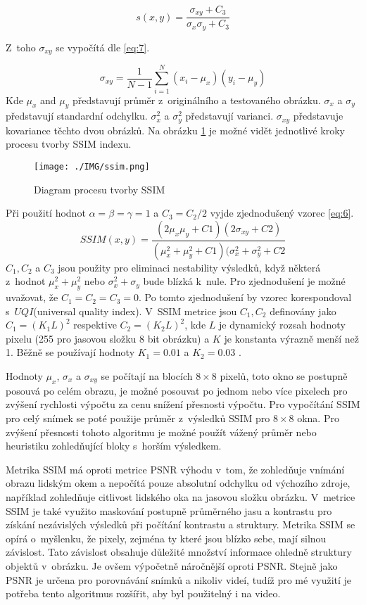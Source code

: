 \documentclass[thesis=M,czech]{FITthesis}[2016/06/26]
\begin{document}
\begin{equation}\label{eq:5}
s(x, y) = \frac{\sigma_{xy} + C_3}{\sigma_x\sigma_y+C_3}
\end{equation}

Z~toho $\sigma_{xy}$ se vypočítá dle \ref{eq:7}.

\begin{equation}\label{eq:7}
\sigma_{xy} = \frac{1}{N-1} \sum_{i=1}^{N} (x_i-\mu_x)(y_i-\mu_y)
\end{equation}
Kde  $\mu_x$ and $\mu_y$ představují průměr z~originálního a testovaného obrázku. $\sigma_x$ a $\sigma_y$ představují standardní odchylku. $\sigma_x^2$ a $\sigma_y^2$ představují varianci. $\sigma_{xy}$ představuje kovariance těchto dvou obrázků.
Na obrázku \ref{fig:ssim} je možné vidět jednotlivé kroky procesu tvorby SSIM indexu.
\begin{figure}[h]\centering
\texttt{[image: ./IMG/ssim.png]}
\caption{Diagram procesu tvorby SSIM}
\label{fig:ssim}
\end{figure}


Při použití hodnot $\alpha = \beta = \gamma = 1$ a $C_3=C_2/2$ \cite{SSIM1} vyjde zjednodušený vzorec \ref{eq:6}.
\begin{equation}\label{eq:6}
\mathit{SSIM}(x, y) = \frac{(2 \mu_x \mu_y + C1) (2 \sigma_{xy} + C2)}{(\mu_x^2+\mu_y^2+C1)(\sigma_x^2+\sigma_y^2+C2}
\end{equation}
$C_1, C_2$ a $C_3$ jsou použity pro eliminaci nestability výsledků, když některá z~hodnot $\mu_x^2+\mu_y^2$ nebo $\sigma_x^2+\sigma_y$ bude blízká k~nule. Pro zjednodušení je možné uvažovat, že $C_1=C_2=C_3=0$. Po tomto zjednodušení by vzorec korespondoval s~$\mathit{UQI}$(universal quality index). V~SSIM metrice jsou $C_1, C_2$ definovány jako $C_1=(K_1L)^2$ respektive $C_2=(K_2L)^2$, kde $L$ je dynamický rozsah hodnoty pixelu (255 pro jasovou složku 8 bit obrázku) a $K$ je konstanta výrazně menší než 1. Běžně se používají hodnoty $K_1=0.01$ a $K_2=0.03$ \cite{SSIM2}.

Hodnoty $\mu_x$, $\sigma_x$ a $\sigma_{xy}$ se počítají na blocích $8\times8$ pixelů, toto okno se postupně posouvá po celém obrazu, je možné posouvat po jednom nebo více pixelech pro zvýšení rychlosti výpočtu za cenu snížení přesnosti výpočtu.
Pro vypočítání SSIM pro celý snímek se poté použije průměr z~výsledků SSIM pro $8\times8$ okna. Pro zvýšení přesnosti tohoto algoritmu je možné použít vážený průměr nebo heuristiku zohledňující bloky s~horším výsledkem\cite{stVSSIM}.

Metrika SSIM má oproti metrice PSNR výhodu v~tom, že zohledňuje vnímání obrazu lidským okem a nepočítá pouze absolutní odchylku od výchozího zdroje, například zohledňuje citlivost lidského oka na jasovou složku obrázku. V~metrice SSIM je také využito maskování postupně průměrného jasu a kontrastu pro získání nezávislých výsledků při počítání kontrastu a struktury. Metrika SSIM se opírá o~myšlenku, že pixely, zejména ty které jsou blízko sebe, mají silnou závislost. Tato závislost obsahuje důležité množství informace ohledně struktury objektů v~obrázku.
Je ovšem výpočetně náročnější oproti PSNR. Stejně jako PSNR je určena pro porovnávání snímků a nikoliv videí, tudíž pro mé využití je potřeba tento algoritmus rozšířit, aby byl použitelný i na video.
\end{document}
